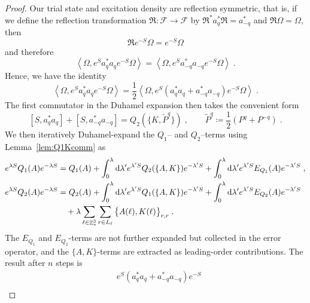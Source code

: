 \documentclass[12pt,a4paper]{article}
\numberwithin{equation}{section}
\newcommand{\cF}{\mathcal{F}}
\newcommand{\fR}{\mathfrak{R}}
\newcommand{\1}{\mathbb{I}}
\newcommand{\di}{\textnormal{d}}
\DeclareMathOperator{\Z}{\mathbb{Z}}
\newcommand{\half}{\frac{1}{2}}
\newcommand{\eva}[1]{\left\langle #1 \right\rangle}
\theoremstyle{plain}
\theoremstyle{definition}
\theoremstyle{remark}
\theoremstyle{plain}
\theoremstyle{definition}
\theoremstyle{remark}
\begin{document}
\begin{proof}
Our trial state and excitation density are reflection symmetric, that is, if we define the reflection transformation $ \fR: \cF \to \cF $ by $ \fR^* a_q^* \fR = a^*_{-q} $ and $ \fR \Omega = \Omega $, then
\begin{equation} \label{eq:reflectionsymmetry}
	\fR e^{-S} \Omega = e^{-S} \Omega
\end{equation}
and therefore
\begin{equation}
	\eva{\Omega, e^{S} a^*_q a_q e^{-S}\Omega} = \eva{\Omega, e^{S} a^*_{-q} a_{-q} e^{-S} \Omega} \;.
\end{equation}
Hence, we have the identity
\begin{equation}
	\eva{\Omega, e^{S} a_q^* a_q e^{-S} \Omega} = \half \eva{\Omega, e^{S} (a_q^* a_q + a_{-q}^* a_{-q}) e^{-S} \Omega} \;.
\end{equation}
The first commutator in the Duhamel expansion then takes the convenient form
\begin{equation} \label{eq:firstcommutator}
	[S, a_q^* a_q] + [S, a_{-q}^* a_{-q}]
	= Q_2(\{K,\tilde{P}^q\}) \;, \qquad
	\tilde{P}^q \coloneq \half(P^q + P^{-q}) \;.
\end{equation}
We then iteratively Duhamel-expand the $ Q_1$-- and $ Q_2 $--terms using Lemma~\ref{lem:Q1Kcomm} as
\begin{equation}
\begin{aligned}
	e^{\lambda S} Q_1(A) e^{-\lambda S}
	&= Q_1(A) + \int_0^{\lambda} \di \lambda' e^{\lambda' S} Q_2(\{A,K\}) e^{-\lambda' S}
		+ \int_0^{\lambda} \di \lambda' e^{\lambda' S} E_{Q_1}(A) e^{-\lambda' S} \;, \\
	e^{\lambda S} Q_2(A) e^{-\lambda S}
	&= Q_2(A) + \int_0^{\lambda} \di \lambda' e^{\lambda' S} Q_1(\{A,K\}) e^{-\lambda' S}
		+ \int_0^{\lambda} \di \lambda' e^{\lambda' S} E_{Q_2}(A) e^{-\lambda' S} \\
	&\quad + \lambda \sum_{\ell \in \Z^3_*} \sum_{r \in L_{\ell}} \big\{ A(\ell), K(\ell) \big\}_{r,r} \;.
\end{aligned}
\end{equation}
The $ E_{Q_1} $ and $ E_{Q_2} $-terms are not further expanded but collected in the error operator, and the $ \{A,K\} $-terms are extracted as leading-order contributions. The result after $ n $ steps is
\begin{equation}
\begin{aligned}
	&e^{S} (a_q^* a_q + a_{-q}^* a_{-q}) e^{-S} \\

\end{aligned}
\end{equation}
\end{proof}
\end{document}
